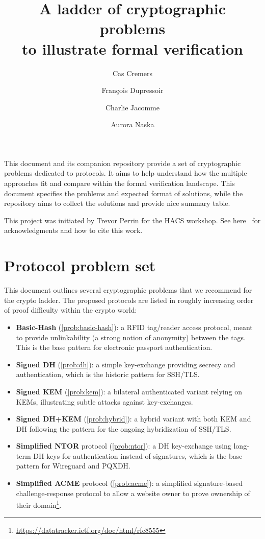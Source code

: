 \documentclass[11pt]{article}
\title{A ladder of cryptographic problems\\
to illustrate formal verification}
\author{Cas Cremers \and Fran\c{c}ois Dupressoir \and Charlie Jacomme \and Aurora Naska}
\begin{document}
\maketitle

This document and its companion repository\cite{ladder-repo} provide a set of cryptographic problems dedicated to protocols. It aims to help understand how the multiple approaches fit and compare within the formal verification landscape. This document specifies the problems and expected format of solutions, while the repository aims to collect the solutions and provide nice summary table.

This project was initiated by Trevor Perrin for the HACS workshop. See here~\cite{ladder-repo-authors} for acknowledgments and how to cite this work.

\section{Protocol problem set}
This document outlines several cryptographic problems that we recommend for the crypto ladder.
The proposed protocols are listed in roughly increasing order of proof difficulty within the crypto world:
\begin{itemize}
\item \textbf{Basic-Hash} (\cref{prob:basic-hash}): a RFID tag/reader access protocol, meant to provide unlinkability (a strong notion of anonymity) between the tags. This is the base pattern for electronic passport authentication.
\item \textbf{Signed DH} (\cref{prob:dh}): a simple key-exchange providing secrecy and authentication, which is the historic pattern for SSH/TLS.
\item \textbf{Signed KEM} (\cref{prob:kem}): a bilateral authenticated variant relying on KEMs, illustrating subtle attacks against key-exchanges. 
\item  \textbf{Signed DH+KEM} (\cref{prob:hybrid}): a hybrid variant with both KEM and DH following the pattern for the ongoing hybridization of SSH/TLS.
\item \textbf{Simplified NTOR} protocol (\cref{prob:ntor}): a DH key-exchange using long-term DH keys for authentication instead of signatures, which is the base pattern for Wireguard and PQXDH.
\item \textbf{Simplified ACME} protocol (\cref{prob:acme}): a simplified signature-based challenge-response protocol to allow a website owner to prove ownership of their domain\footnote{\url{https://datatracker.ietf.org/doc/html/rfc8555}}.
\end{itemize}
\end{document}
